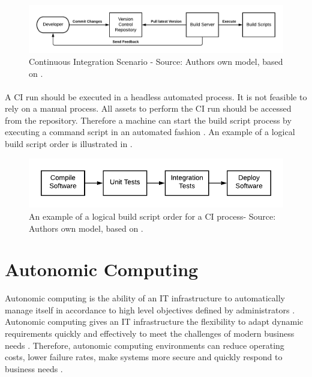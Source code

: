 \begin{figure}[h]
\centering
\includegraphics[scale=0.7]{images/02_theoretical_foundation/deployment_pipeline/ci_scenario}
\caption{Continuous Integration Scenario - Source: Authors own model, based on \cite{Duvall2007CI}.}
\label{fig:02_foundation_deployment_ci_scenario}
\end{figure}


\paragraph{}A CI run should be executed in a headless automated process. It is not feasible to rely on a manual process.
All assets to perform the CI run should be accessed from the repository. Therefore a machine can start the build script process by executing a command script in an automated fashion \cite{Duvall2007CI}.
An example of a logical build script order is illustrated in .


\begin{figure}[h]
\centering
\includegraphics[scale=1]{images/02_theoretical_foundation/deployment_pipeline/ci_build_script_order}
\caption{An example of a logical build script order for a CI process- Source: Authors own model, based on \cite{Duvall2007CI}.}
\label{fig:02_foundation_deployment_ci_script-order}
\end{figure}


\section{Autonomic Computing}
\label{sec:02_ac}
Autonomic computing is the ability of an IT infrastructure to automatically manage itself in accordance to high level objectives defined by administrators \cite{Kephart2003VisionComputing}.
Autonomic computing gives an IT infrastructure the flexibility to adapt dynamic requirements quickly and effectively to meet the challenges of modern business needs \cite{Murch2004Autonomic}. Therefore, autonomic computing environments can reduce operating costs, lower failure rates, make systems more secure and quickly respond to business needs \cite{Jacob2004AutonomicSolution}.


